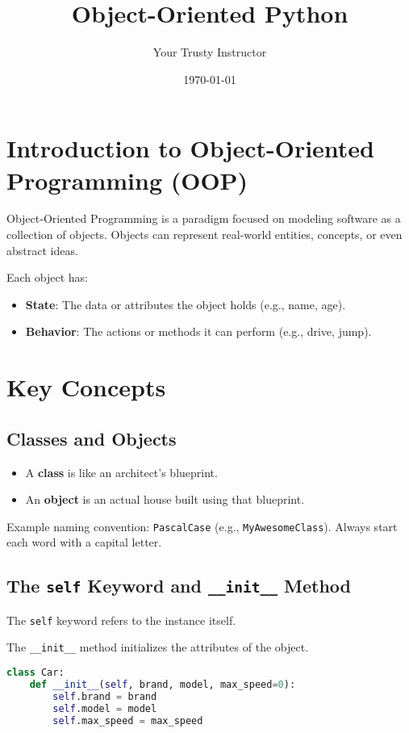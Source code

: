 \documentclass[12pt,a4paper]{article}
\title{\Huge\textbf{Object-Oriented Python}}
\author{Your Trusty Instructor}
\date{\today}
\begin{document}
\maketitle

\section*{Introduction to Object-Oriented Programming (OOP)}

Object-Oriented Programming is a paradigm focused on modeling software as a collection of objects. Objects can represent real-world entities, concepts, or even abstract ideas.

Each object has:
\begin{itemize}
  \item \textbf{State}: The data or attributes the object holds (e.g., name, age).
  \item \textbf{Behavior}: The actions or methods it can perform (e.g., drive, jump).
\end{itemize}

\section{Key Concepts}

\subsection{Classes and Objects}
\begin{itemize}
  \item A \textbf{class} is like an architect's blueprint.
  \item An \textbf{object} is an actual house built using that blueprint.
\end{itemize}

Example naming convention: \texttt{PascalCase} (e.g., \texttt{MyAwesomeClass}). Always start each word with a capital letter.

\subsection{The \texttt{self} Keyword and \texttt{\_\_init\_\_} Method}
The \texttt{self} keyword refers to the instance itself.

The \texttt{\_\_init\_\_} method initializes the attributes of the object.

\begin{lstlisting}[language=Python]
class Car:
    def __init__(self, brand, model, max_speed=0):
        self.brand = brand
        self.model = model
        self.max_speed = max_speed
\end{lstlisting}
\end{document}
